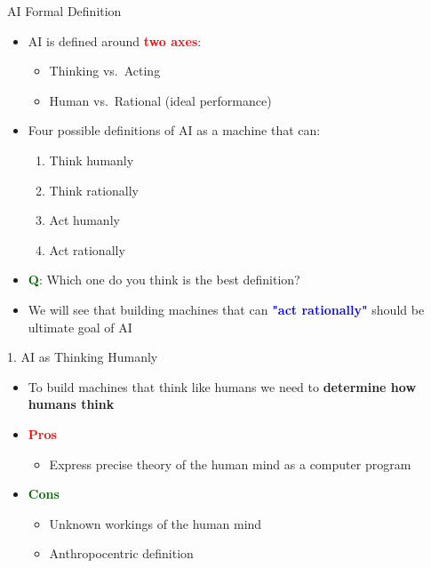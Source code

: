 \documentclass[
  10pt,
  ignorenonframetext,
]{beamer}
\providecommand{\tightlist}{%
  \setlength{\itemsep}{0pt}\setlength{\parskip}{0pt}}
\begin{document}
\begin{frame}{AI Formal Definition}
\label{ai-formal-definition}
\begin{itemize}
\item
  AI is defined around \textbf{\textcolor{red}{two axes}}:

  \begin{itemize}
  \tightlist
  \item
    Thinking vs.~Acting
  \item
    Human vs.~Rational (ideal performance)
  \end{itemize}
\item
  Four possible definitions of AI as a machine that can:

  \begin{enumerate}
  \tightlist
  \item
    Think humanly
  \item
    Think rationally
  \item
    Act humanly
  \item
    Act rationally
  \end{enumerate}
\item
  \textbf{\textcolor{darkgreen}{Q}}: Which one do you think is the best
  definition?
\item
  We will see that building machines that can
  \textbf{\textcolor{blue}{"act rationally"}} should be ultimate goal of
  AI
\end{itemize}
\end{frame}

\begin{frame}{1. AI as Thinking Humanly}
\label{ai-as-thinking-humanly}
\begin{itemize}
\item
  To build machines that think like humans we need to \textbf{determine
  how humans think}
\item
  \textbf{\textcolor{red}{Pros}}

  \begin{itemize}
  \tightlist
  \item
    Express precise theory of the human mind as a computer program
  \end{itemize}
\item
  \textbf{\textcolor{darkgreen}{Cons}}

  \begin{itemize}
  \tightlist
  \item
    Unknown workings of the human mind
  \item
    Anthropocentric definition
  \end{itemize}
\end{itemize}
\end{frame}
\end{document}
